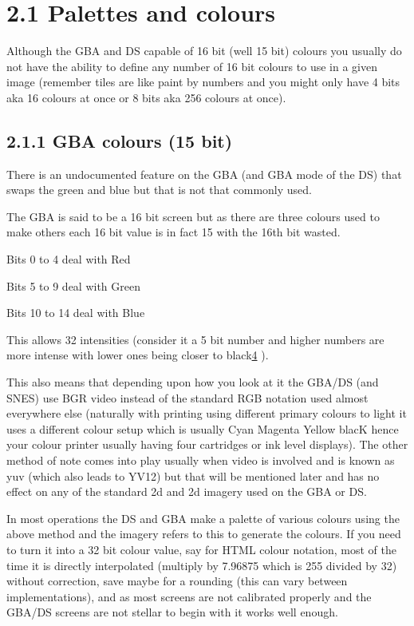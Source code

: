 \documentclass[
]{book}
\begin{document}
\hypertarget{palettes-and-colours}{%
\section{2.1 Palettes and colours}\label{palettes-and-colours}}

Although the GBA and DS capable of 16 bit (well 15 bit) colours you usually do not have the ability to define any number of 16 bit colours to use in a given image (remember tiles are like paint by numbers and you might only have 4 bits aka 16 colours at once or 8 bits aka 256 colours at once).

\hypertarget{gba-colours-15-bit}{%
\subsection{2.1.1 GBA colours (15 bit)}\label{gba-colours-15-bit}}

There is an undocumented feature on the GBA (and GBA mode of the DS) that swaps the green and blue but that is not that commonly used.

The GBA is said to be a 16 bit screen but as there are three colours used to make others each 16 bit value is in fact 15 with the 16th bit wasted.

Bits 0 to 4 deal with Red

Bits 5 to 9 deal with Green

Bits 10 to 14 deal with Blue

This allows 32 intensities (consider it a 5 bit number and higher numbers are more intense with lower ones being closer to black\href{romhacking20205.html\#fn4x0}{4} ).

This also means that depending upon how you look at it the GBA/DS (and SNES) use BGR video instead of the standard RGB notation used almost everywhere else (naturally with printing using different primary colours to light it uses a different colour setup which is usually Cyan Magenta Yellow blacK hence your colour printer usually having four cartridges or ink level displays). The other method of note comes into play usually when video is involved and is known as yuv (which also leads to YV12) but that will be mentioned later and has no effect on any of the standard 2d and 2d imagery used on the GBA or DS.

In most operations the DS and GBA make a palette of various colours using the above method and the imagery refers to this to generate the colours. If you need to turn it into a 32 bit colour value, say for HTML colour notation, most of the time it is directly interpolated (multiply by 7.96875 which is 255 divided by 32) without correction, save maybe for a rounding (this can vary between implementations), and as most screens are not calibrated properly and the GBA/DS screens are not stellar to begin with it works well enough.
\end{document}
